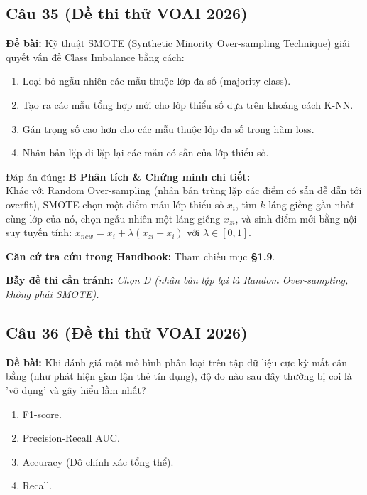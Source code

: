 \documentclass[10pt,a4paper]{article}
\begin{document}
\subsection*{Câu 35 (Đề thi thử VOAI 2026)}
\textbf{Đề bài:} Kỹ thuật SMOTE (Synthetic Minority Over-sampling Technique) giải quyết vấn đề Class Imbalance bằng cách:

\begin{enumerate}[label=\textbf{\Alph*.}]
    \item Loại bỏ ngẫu nhiên các mẫu thuộc lớp đa số (majority class).
    \item Tạo ra các mẫu tổng hợp mới cho lớp thiểu số dựa trên khoảng cách K-NN.
    \item Gán trọng số cao hơn cho các mẫu thuộc lớp đa số trong hàm loss.
    \item Nhân bản lặp đi lặp lại các mẫu có sẵn của lớp thiểu số.
\end{enumerate}

\begin{solbox}{Đáp án đúng: \textbf{B}}
\textbf{Phân tích \& Chứng minh chi tiết:} \\
Khác với Random Over-sampling (nhân bản trùng lặp các điểm có sẵn dễ dẫn tới overfit), SMOTE chọn một điểm mẫu lớp thiểu số $x_i$, tìm $k$ láng giềng gần nhất cùng lớp của nó, chọn ngẫu nhiên một láng giềng $x_{zi}$, và sinh điểm mới bằng nội suy tuyến tính: $x_{new} = x_i + \lambda (x_{zi} - x_i)$ với $\lambda \in [0, 1]$.

\vspace{0.4em}
\textbf{Căn cứ tra cứu trong Handbook:} Tham chiếu mục \textbf{§1.9}.

\vspace{0.4em}
\textbf{Bẫy đề thi cần tránh:} \textit{Chọn D (nhân bản lặp lại là Random Over-sampling, không phải SMOTE).}
\end{solbox}
\vspace{0.5em}


\subsection*{Câu 36 (Đề thi thử VOAI 2026)}
\textbf{Đề bài:} Khi đánh giá một mô hình phân loại trên tập dữ liệu cực kỳ mất cân bằng (như phát hiện gian lận thẻ tín dụng), độ đo nào sau đây thường bị coi là 'vô dụng' và gây hiểu lầm nhất?

\begin{enumerate}[label=\textbf{\Alph*.}]
    \item F1-score.
    \item Precision-Recall AUC.
    \item Accuracy (Độ chính xác tổng thể).
    \item Recall.
\end{enumerate}
\end{document}
